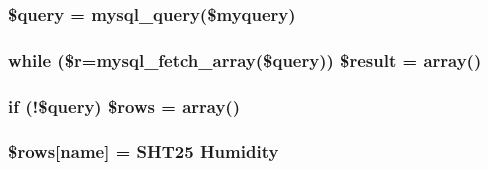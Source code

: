 \subsubsection[{\texorpdfstring{\$query}{$query}}]{\setlength{\rightskip}{0pt plus 5cm}\$query = mysql\+\_\+query(\$myquery)}\hypertarget{_s_h_t25___j_s_o_n_8php_af59a5f7cd609e592c41dc3643efd3c98}{}\label{_s_h_t25___j_s_o_n_8php_af59a5f7cd609e592c41dc3643efd3c98}
\subsubsection[{\texorpdfstring{\$result}{$result}}]{\setlength{\rightskip}{0pt plus 5cm}while (\$r=mysql\+\_\+fetch\+\_\+array(\$query)) \$result = array()}\hypertarget{_s_h_t25___j_s_o_n_8php_a9148136d1e11f768be4f805d7e567da2}{}\label{_s_h_t25___j_s_o_n_8php_a9148136d1e11f768be4f805d7e567da2}
\subsubsection[{\texorpdfstring{\$rows}{$rows}}]{\setlength{\rightskip}{0pt plus 5cm}if (!\$query) \$rows = array()}\hypertarget{_s_h_t25___j_s_o_n_8php_a9d560e904e6665a6ee21f86a65c1ef8e}{}\label{_s_h_t25___j_s_o_n_8php_a9d560e904e6665a6ee21f86a65c1ef8e}
\subsubsection[{\texorpdfstring{\$rows}{$rows}}]{\setlength{\rightskip}{0pt plus 5cm}\$rows\mbox{[}\textquotesingle{}name\textquotesingle{}\mbox{]} = \textquotesingle{}S\+H\+T25 Humidity\textquotesingle{}}\hypertarget{_s_h_t25___j_s_o_n_8php_a6384d385f2f9c3f6bcad27ed87e67106}{}\label{_s_h_t25___j_s_o_n_8php_a6384d385f2f9c3f6bcad27ed87e67106}
